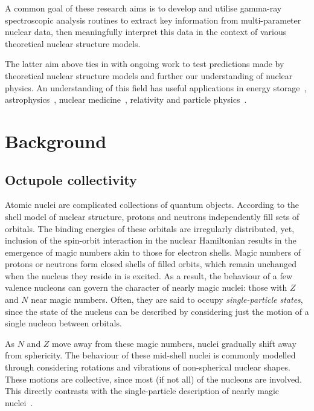 \documentclass[12pt,a4paper]{article}
\begin{document}
\medskip
\noindent
A common goal of these research aims is to develop and utilise gamma-ray spectroscopic analysis routines to extract key information from multi-parameter nuclear data, then meaningfully interpret this data in the context of various theoretical nuclear structure models.

\medskip
\noindent
The latter aim above ties in with ongoing work to test predictions made by theoretical nuclear structure models and further our understanding of nuclear physics.
An understanding of this field has useful applications in energy storage~\cite{shaffer_innovations_2018}, astrophysics~\cite{hayakawa_neutron_2009}, nuclear medicine~\cite{krane_introductory_1987}, relativity and particle physics~\cite{casten_nuclear_1990}.

\section*{Background}

\subsection*{Octupole collectivity}

\medskip
\noindent
Atomic nuclei are complicated collections of quantum objects.
According to the shell model of nuclear structure, protons and neutrons independently fill sets of orbitals.
The binding energies of these orbitals are irregularly distributed, yet, inclusion of the spin-orbit interaction in the nuclear Hamiltonian results in the emergence of magic numbers akin to those for electron shells.
Magic numbers of protons or neutrons form closed shells of filled orbits, which remain unchanged when the nucleus they reside in is excited.
As a result, the behaviour of a few valence nucleons can govern the character of nearly magic nuclei: those with $Z$ and $N$ near magic numbers.
Often, they are said to occupy \textit{single-particle states}, since the state of the nucleus can be described by considering just the motion of a single nucleon between orbitals.

\medskip
\noindent
As $N$ and $Z$ move away from these magic numbers, nuclei gradually shift away from sphericity.
The behaviour of these mid-shell nuclei is commonly modelled through considering rotations and vibrations of non-spherical nuclear shapes.
These motions are collective, since most (if not all) of the nucleons are involved.
This directly contrasts with the single-particle description of nearly magic nuclei~\cite{casten_nuclear_1990}.
\end{document}
